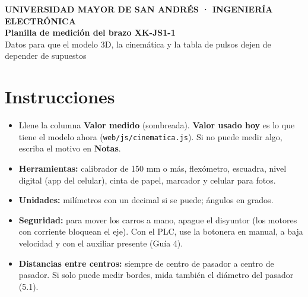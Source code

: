 \documentclass[10pt]{article}
\newcommand{\cod}[1]{\texttt{\footnotesize #1}}
\begin{document}
\color{grayblack}

\begin{center}
{\large\bfseries UNIVERSIDAD MAYOR DE SAN ANDRÉS · INGENIERÍA ELECTRÓNICA}\\[2pt]
{\LARGE\bfseries\color{cafe} Planilla de medición del brazo XK-JS1-1}\\[2pt]
{\normalsize Datos para que el modelo 3D, la cinemática y la tabla de pulsos dejen de depender de supuestos}
\end{center}

\section{Instrucciones}
\begin{minipage}[t]{0.47\textwidth}
\begin{itemize}[leftmargin=12pt, itemsep=1pt]
\item Llene la columna \textbf{Valor medido} (sombreada). \textbf{Valor usado hoy} es lo que tiene el modelo ahora
      (\cod{web/js/cinematica.js}). Si no puede medir algo, escriba el motivo en \textbf{Notas}.
\item \textbf{Herramientas:} calibrador de 150 mm o más, flexómetro, escuadra, nivel digital (app del celular),
      cinta de papel, marcador y celular para fotos.
\item \textbf{Unidades:} milímetros con un decimal si se puede; ángulos en grados.
\item \textbf{Seguridad:} para mover los carros a mano, apague el disyuntor (los motores con corriente bloquean el
      eje). Con el PLC, use la botonera en manual, a baja velocidad y con el auxiliar presente (Guía 4).
\item \textbf{Distancias entre centros:} siempre de centro de pasador a centro de pasador. Si solo puede medir
      bordes, mida también el diámetro del pasador (5.1).
\end{itemize}
\end{minipage}\hfill
\end{document}
